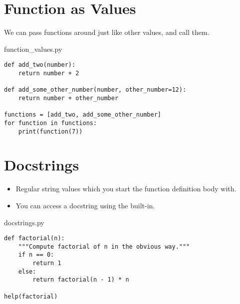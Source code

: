 \documentclass[aspectratio=1610,slidestop]{beamer}
\begin{document}
\section{Function as Values}

\begin{pframe}
\vspace{-0.5cm}
 We can pass functions around just like other values, and call them.
 \begin{pythonfile}{function\_values.py}
  \begin{verbatim}
def add_two(number):
    return number + 2

def add_some_other_number(number, other_number=12):
    return number + other_number

functions = [add_two, add_some_other_number]
for function in functions:
    print(function(7))
  \end{verbatim}
 \end{pythonfile}
 \pause
 \begin{terminal}
 \end{terminal}
\end{pframe}



\section{Docstrings}
\begin{pframe}
 \vspace{-1.1cm}
 \begin{itemize}
  \item Regular string values which you start the function definition body with.
  \item You can access a docstring using the  built-in.
 \end{itemize}
 \vspace{-0.3cm}
 \begin{pythonfile}{docstrings.py}
  \begin{verbatim}
def factorial(n):
    """Compute factorial of n in the obvious way."""
    if n == 0:
        return 1
    else:
        return factorial(n - 1) * n

help(factorial)
  \end{verbatim}
 \end{pythonfile}
 \pause
 \begin{terminal}
 \end{terminal}
\end{pframe}
\end{document}

